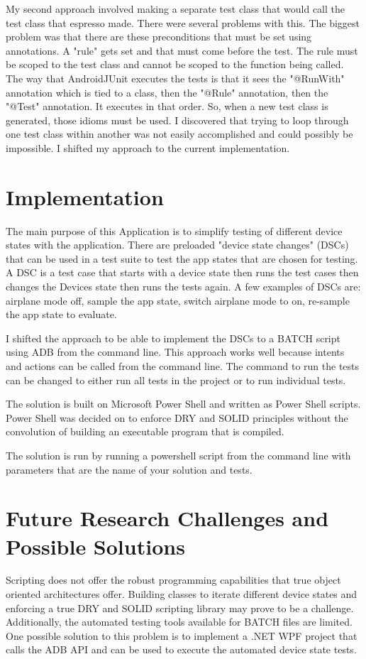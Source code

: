 My second approach involved making a separate test class that would call the test class that espresso made.  There were several problems with this.  The biggest problem was that there are these preconditions that must be set using annotations.  A "rule" gets set and that must come before the test.  The rule must be scoped to the test class and cannot be scoped to the function being called.  The way that AndroidJUnit executes the tests is that it sees the "@RunWith" annotation which is tied to a class, then the "@Rule" annotation, then the "@Test" annotation.  It executes in that order.  So, when a new test class is generated, those idioms must be used. I discovered that trying to loop through one test class within another was not easily accomplished and could possibly be impossible.  I shifted my approach to the current implementation.


\section{Implementation}
The main purpose of this Application is to simplify testing of different device states with the application.  There are preloaded "device state changes" (DSCs) that can be used in a test suite to test the app states that are chosen for testing.  A DSC is a test case that starts with a device state then runs the test cases then changes the Devices state then runs the tests again.  A few examples of DSCs are: airplane mode off, sample the app state, switch airplane mode to on, re-sample the app state to evaluate.

I shifted the approach to be able to implement the DSCs to a BATCH script using ADB from the command line.  This approach works well because intents and actions can be called from the command line.  The command to run the tests can be changed to either run all tests in the project or to run individual tests.  

The solution is built on Microsoft Power Shell and written as Power Shell scripts.  Power Shell was decided on to enforce DRY and SOLID principles without the convolution of building an executable program that is compiled.  

The solution is run by running a powershell script from the command line with parameters that are the name of your solution and tests.

\section{Future Research Challenges and Possible Solutions}
Scripting does not offer the robust programming capabilities that true object oriented architectures offer.  Building classes to iterate different device states and enforcing a true DRY and SOLID scripting library may prove to be a challenge.  Additionally, the automated testing tools available for BATCH files are limited.  One possible solution to this problem is to implement a .NET WPF project that calls the ADB API and can be used to execute the automated device state tests.  

